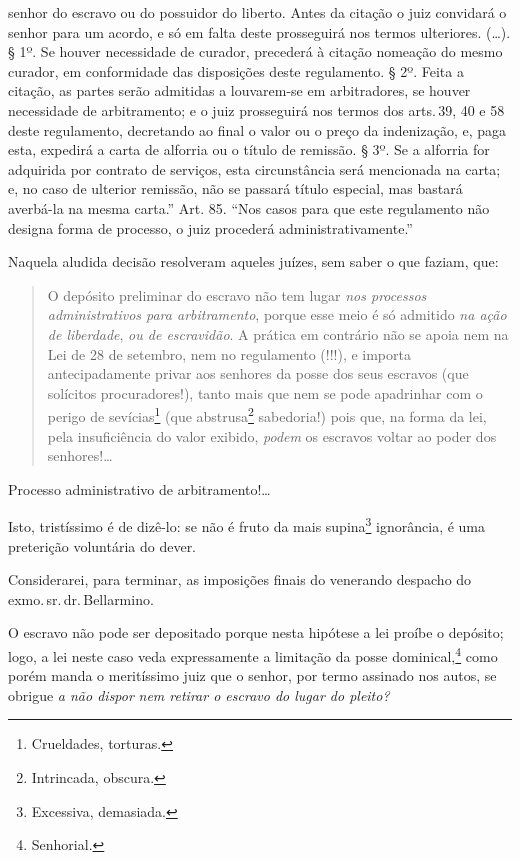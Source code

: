 {  senhor do escravo ou do possuidor do liberto. Antes da citação o juiz
  convidará o senhor para um acordo, e só em falta deste prosseguirá nos
  termos ulteriores. (\ldots{}). § 1º. Se houver necessidade de curador,
  precederá à citação nomeação do mesmo curador, em conformidade das
  disposições deste regulamento. § 2º. Feita a citação, as partes serão
  admitidas a louvarem-se em arbitradores, se houver necessidade de
  arbitramento; e o juiz prosseguirá nos termos dos arts.\,39, 40 e 58
  deste regulamento, decretando ao final o valor ou o preço da
  indenização, e, paga esta, expedirá a carta de alforria ou o título de
  remissão. § 3º. Se a alforria for adquirida por contrato de serviços,
  esta circunstância será mencionada na carta; e, no caso de ulterior
  remissão, não se passará título especial, mas bastará averbá-la na
  mesma carta.'' Art. 85. ``Nos casos para que este regulamento não designa
  forma de processo, o juiz procederá administrativamente.''}

Naquela aludida decisão resolveram aqueles juízes, sem saber o que
faziam, que:

\begin{quote}
O depósito preliminar do escravo não tem lugar \emph{nos processos
administrativos para arbitramento}, porque esse meio é só admitido
\emph{na ação de liberdade}, \emph{ou de escravidão}. A prática em
contrário não se apoia nem na Lei de 28 de setembro, nem no regulamento
(!!!), e importa antecipadamente privar aos senhores da posse dos seus
escravos (que solícitos procuradores!), tanto mais que nem se pode
apadrinhar com o perigo de sevícias\footnote{Crueldades, torturas.}
(que abstrusa\footnote{Intrincada, obscura.} sabedoria!) pois que, na
forma da lei, pela insuficiência do valor exibido, \emph{podem} os
escravos voltar ao poder dos senhores!\ldots{}
\end{quote}

Processo administrativo de arbitramento!\ldots{}

Isto, tristíssimo é de dizê-lo: se não é fruto da mais supina\footnote{
  Excessiva, demasiada.} ignorância, é uma preterição voluntária do
dever.

Considerarei, para terminar, as imposições finais do venerando despacho
do exmo.\,sr.\,dr.\,Bellarmino.

O escravo não pode ser depositado porque nesta hipótese a lei proíbe o
depósito; logo, a lei neste caso veda expressamente a limitação da posse
dominical,\footnote{Senhorial.} como porém manda o meritíssimo juiz
que o senhor, por termo assinado nos autos, se obrigue \emph{a não
dispor} \emph{nem retirar o escravo do lugar do pleito? }

